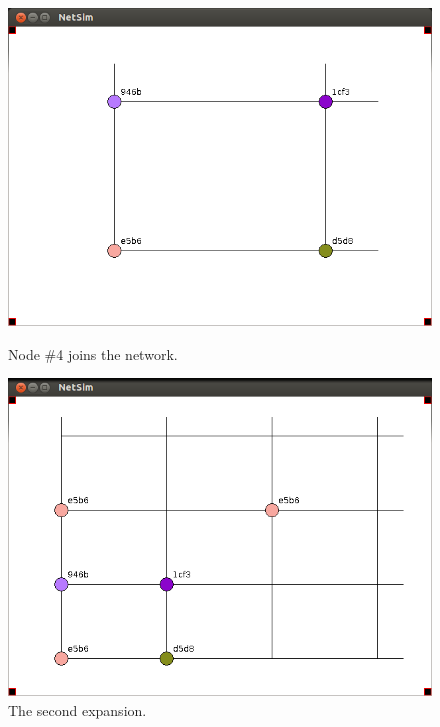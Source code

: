 \documentclass[ %
                    author={Luke Murray},
                supervisor={Dr. Simon Hollis},
                     title={Shadow Peer-to-Peer Networks},
                  subtitle={},
                    degree={MEng},
                      year={2013} ]{thesis}
\begin{document}
\begin{figure}[h]
\begin{minipage}[b]{0.45\linewidth}
        \includegraphics[width=\linewidth]{sim_pics/expand_5.png}
        \caption{Node \#4 joins the network.}
        \label{sim_expand5}
    \end{minipage}
    \hspace{0.5cm}
    \begin{minipage}[b]{0.45\linewidth}
        \centering
        \includegraphics[width=\linewidth]{sim_pics/expand_6.png}
        \caption{The second expansion.}
        \label{sim_expand6}
    \end{minipage}
\end{figure}
\end{document}
